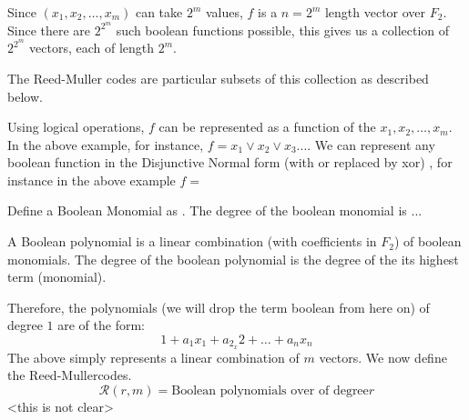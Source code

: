 \documentclass{article}
\newcommand{\RM}[2]{\ensuremath{\mathcal{R}(#1,#2)}}
\newcommand{\rem}{Reed-Muller}
\begin{document}
Since $(x_1,x_2,\ldots,x_m)$ can take $2^m$ values, $f$ is a $n=2^m$ length vector over $F_2$. Since there are $2^2^m$ such boolean functions possible, this gives us a collection of  $2^2^m$ vectors, each of length $2^m$.
 
The Reed-Muller codes are particular subsets of this collection as described below.

Using logical operations, $f$ can be represented as a function of the $x_1, x_2, \ldots , x_m$. In the above example, for instance, $f = x_1 \vee x_2 \vee x_3 ... $. We can represent any boolean function in the Disjunctive Normal form (with or replaced by xor) \cite{Problem2}, for instance in the above example $f = $

Define a Boolean Monomial as .
The degree of the boolean monomial is ...

A Boolean polynomial is a linear combination (with coefficients in $F_2$) of boolean monomials. The degree of the boolean polynomial is the degree of the its highest term (monomial).

Therefore, the polynomials (we will drop the term boolean from here on) of degree $1$ are of the form:
\begin{equation}
 1+a_1x_1+a_2_x2+\ldots+a_nx_n
\end{equation}
The above simply represents a linear combination of $m$ vectors.
We now define the \rem codes.
\begin{equation}

\RM{r}{m} = \text{Boolean polynomials over of degree} r
\end{equation}
<this is not clear>
\end{document}
